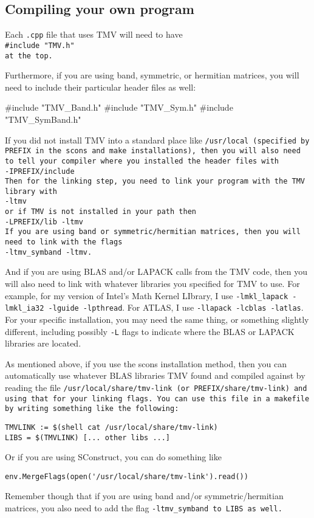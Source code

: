 \subsection{Compiling your own program}

Each \texttt{.cpp} file that uses TMV will need to have \\
\tt{\#include "TMV.h"}\\
at the top.

Furthermore, if you are using band, symmetric, or hermitian matrices, you
will need to include their particular header files as well:
\begin{tmvcode}
#include "TMV_Band.h"
#include "TMV_Sym.h"
#include "TMV_SymBand.h"
\end{tmvcode}

If you did not install TMV into a standard place like \tt{/usr/local} (specified
by \tt{PREFIX} in the scons and make installations), then you will also
need to tell your compiler where you installed the header files with\\
\tt{-IPREFIX/include}\\
Then for the linking step, you need to link your program with the TMV
library with\\
\tt{-ltmv}\\
or if TMV is not installed in your path then\\
\tt{-LPREFIX/lib -ltmv}\\
If you are using band or symmetric/hermitian matrices, then you will
need to link with the flags\\
\tt{-ltmv\_symband -ltmv}.

And if you are using BLAS and/or LAPACK calls from the TMV code,
then you will also need to
link with whatever libraries you specified for TMV to use.
For example, for my version of Intel's Math Kernel LIbrary, I use
\texttt{-lmkl\_lapack -lmkl\_ia32 -lguide -lpthread}.
For ATLAS,
I use \texttt{-llapack -lcblas -latlas}.  For your specific installation, you may need
the same thing, or something slightly different, including possibly
\texttt{-L} flags to indicate where the BLAS or LAPACK libraries are located.

As mentioned above, if you use the scons installation method, then 
you can automatically use whatever BLAS libraries
TMV found and compiled against by reading the file
\tt{/usr/local/share/tmv-link} (or \tt{PREFIX/share/tmv-link}) and using that
for your linking flags.  
You can use this file in a makefile by writing 
something like the following:
\begin{verbatim}
TMVLINK := $(shell cat /usr/local/share/tmv-link)
LIBS = $(TMVLINK) [... other libs ...]
\end{verbatim}
Or if you are using SConstruct, you can do something like
\begin{verbatim}
env.MergeFlags(open('/usr/local/share/tmv-link').read())
\end{verbatim}
Remember though that if you are using band and/or symmetric/hermitian matrices, you
also need to add the flag \tt{-ltmv\_symband} to \tt{LIBS} as well.

